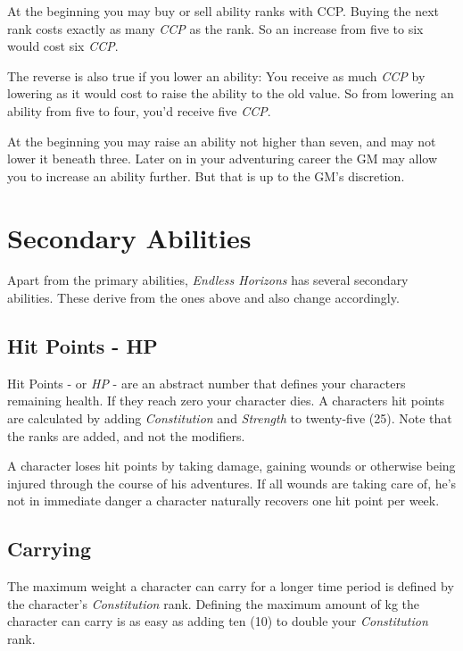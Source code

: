 At the beginning you may buy or sell ability ranks with CCP. Buying the next
rank costs exactly as many \emph{CCP} as the rank. So an increase from five to
six would cost six \emph{CCP}.

The reverse is also true if you lower an ability: You receive as much \emph{CCP}
by lowering as it would cost to raise the ability to the old value. So from
lowering an ability from five to four, you'd receive five \emph{CCP}.

At the beginning you may raise an ability not higher than seven, and may not
lower it beneath three. Later on in your adventuring career the GM may allow you
to increase an ability further. But that is up to the GM's discretion.

\section{Secondary Abilities}
\label{sec:2-Secondary Abilities}

Apart from the primary abilities, \emph{Endless Horizons} has several secondary
abilities. These derive from the ones above and also change accordingly.

\subsection{Hit Points - HP}
\label{sub:2-Hit Points}

Hit Points - or \emph{HP} - are an abstract number that defines your characters
remaining health. If they reach zero your character dies. A characters hit
points are calculated by adding \emph{Constitution} and \emph{Strength} to
twenty-five (25). Note that the ranks are added, and not the modifiers.

A character loses hit points by taking damage, gaining wounds or otherwise being
injured through the course of his adventures. If all wounds are taking care of,
he's not in immediate danger a character naturally recovers one hit point per
week.

\subsection{Carrying}
\label{subs:2-Carrying}

The maximum weight a character can carry for a longer time period is defined
by the character's \emph{Constitution} rank. Defining the maximum amount of kg
the character can carry is as easy as adding ten (10) to double your
\emph{Constitution} rank.

